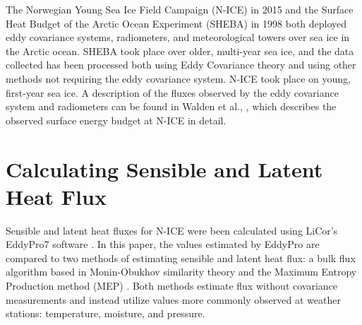 The Norwegian Young Sea Ice Field Campaign (N-ICE) in 2015 and the Surface Heat Budget of the Arctic Ocean Experiment (SHEBA) in 1998 both deployed eddy covariance systems, radiometers, and meteorological towers over sea ice in the Arctic ocean. SHEBA took place over older, multi-year sea ice, and the data collected has been processed both using Eddy Covariance theory and using other methods not requiring the eddy covariance system. N-ICE took place on young, first-year sea ice. A description of the fluxes observed by the eddy covariance system and radiometers can be found in Walden et al., \cite{walden:2017}, which describes the observed surface energy budget at N-ICE in detail. 


\section{Calculating Sensible and Latent Heat Flux}
Sensible and latent heat fluxes for N-ICE were been calculated using LiCor’s EddyPro7 software \cite{epro}. In this paper, the values estimated by EddyPro are compared to two methods of estimating sensible and latent heat flux: a bulk flux algorithm based in Monin-Obukhov similarity theory \cite{foken:2008} and the Maximum Entropy Production method (MEP) \cite{zhang:2021, wang:2014, wang:2009}. Both methods estimate flux without covariance measurements and instead utilize values more commonly observed at weather stations: temperature, moisture, and pressure.


